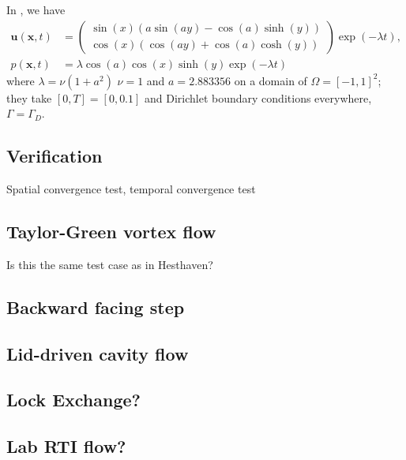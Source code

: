 In \cite{fehn_stability_2017}, we have
\begin{equation}
  \begin{aligned}
  \bm{u}(\bm{x}, t) &= 
  \begin{pmatrix}
    \sin(x) (a\sin(a y) - \cos(a)\sinh(y)) \\
    \cos(x) (\cos(a y) + \cos(a)\cosh(y))
  \end{pmatrix}
  \exp(-\lambda t),\\
    p(\bm{x}, t) &= \lambda \cos(a) \cos(x) \sinh(y) \exp(-\lambda t)
  \end{aligned}
  \label{eq:MS_unsteady_stokes_fehn}
\end{equation}
where $\lambda = \nu(1 + a^2)$ $\nu = 1$ and $a = 2.883356$ on a domain of  $\Omega = [-1, 1]^2$; they take $[0, T] = [0, 0.1]$ and Dirichlet boundary conditions everywhere, $\Gamma = \Gamma_D$.

\subsection{Verification}
Spatial convergence test, temporal convergence test




\subsection{Taylor-Green vortex flow}
Is this the same test case as in Hesthaven?

\subsection{Backward facing step}

\subsection{Lid-driven cavity flow}

\subsection{Lock Exchange?}
\subsection{Lab RTI flow?}
